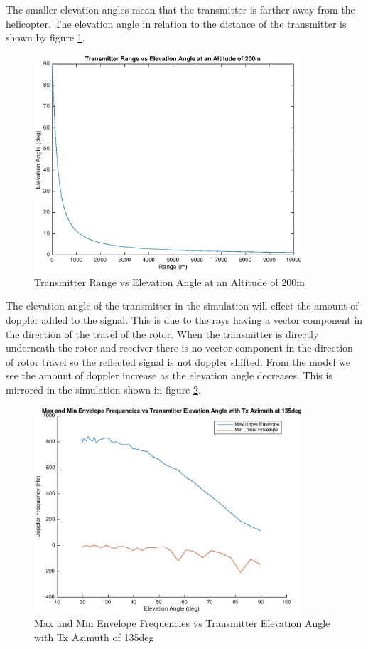 The smaller elevation angles mean that the transmitter is farther away from the helicopter. The elevation angle in relation to the distance of the transmitter is shown by figure \ref{fig:tx_range_elevation_rel}.

 \begin{figure}
	\begin{center}
		\includegraphics[width=10cm]{images/simulation/range_elevation_rel.eps}
		\caption{Transmitter Range vs Elevation Angle at an Altitude of 200m}
		\label{fig:tx_range_elevation_rel}
	\end{center}
\end{figure}

The elevation angle of the transmitter in the simulation will effect the amount of doppler added to the signal. This is due to the rays having a vector component in the direction of the travel of the rotor. When the transmitter is directly underneath the rotor and receiver there is no vector component in the direction of rotor travel so the reflected signal is not doppler shifted. From the model we see the amount of doppler increase as the elevation angle decreases. This is mirrored in the simulation shown in figure \ref{fig:tx_elevation_135deg}.

 \begin{figure}
	\begin{center}
		\includegraphics[width=10cm]{images/simulation/elevation_angle_max_doppler_135deg.eps}
		\caption{Max and Min Envelope Frequencies vs Transmitter Elevation Angle with Tx Azimuth of 135deg}
		\label{fig:tx_elevation_135deg}
	\end{center}
\end{figure}

